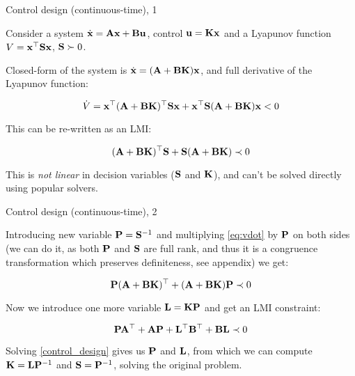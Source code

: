 \documentclass{beamer}
\begin{document}
\begin{frame}{Control design (continuous-time), 1}
	\begin{flushleft}
		
		Consider a system $\dot{\mathbf{x}} = \mathbf{A}\mathbf{x} + \mathbf{B}\mathbf{u}$, control $\mathbf{u} = \mathbf{K}\mathbf{x}$ and a Lyapunov function $V = \mathbf{x}^\top\mathbf{S}\mathbf{x}$, $\mathbf{S} \succ 0$.
		
		\bigskip
		
		Closed-form of the system is $\dot{\mathbf{x}} = (\mathbf{A} + \mathbf{B}\mathbf{K})\mathbf{x}$, and full derivative of the Lyapunov function:
		
		\begin{equation}
			\dot V = \mathbf{x}^\top (\mathbf{A} + \mathbf{B}\mathbf{K})^\top\mathbf{S}\mathbf{x} + \mathbf{x}^\top\mathbf{S} (\mathbf{A} + \mathbf{B}\mathbf{K}) \mathbf{x} < 0
		\end{equation}
		
		This can be re-written as an LMI:
		
		\begin{equation}
			\label{eq:vdot}
			(\mathbf{A} + \mathbf{B}\mathbf{K})^\top\mathbf{S} + \mathbf{S} (\mathbf{A} + \mathbf{B}\mathbf{K}) \prec 0
		\end{equation}
		
		This is \emph{not linear} in decision variables ($\mathbf{S}$ and $\mathbf{K}$), and can't be solved directly using popular solvers.
		
	\end{flushleft}
\end{frame}




\begin{frame}{Control design (continuous-time), 2}
	\begin{flushleft}
		
		Introducing new variable $\mathbf{P} = \mathbf{S}^{-1}$ and multiplying \eqref{eq:vdot} by $\mathbf{P}$ on both sides (we can do it, as both $\mathbf{P}$ and $\mathbf{S}$ are full rank, and thus it is a congruence transformation which preserves definiteness, see appendix) we get:
		
		\begin{equation}
			\mathbf{P}(\mathbf{A} + \mathbf{B}\mathbf{K})^\top + (\mathbf{A} + \mathbf{B}\mathbf{K})\mathbf{P} \prec 0
		\end{equation}
		
		Now we introduce one more variable $\mathbf{L} = \mathbf{K}\mathbf{P}$ and get an LMI constraint:
		
		\begin{equation}
			\label{control_design}
			\mathbf{P}\mathbf{A}^\top + \mathbf{A}\mathbf{P} + \mathbf{L}^\top\mathbf{B}^\top + \mathbf{B}\mathbf{L} \prec 0
		\end{equation}
		
		Solving \eqref{control_design} gives us $\mathbf{P}$ and $\mathbf{L}$, from which we can compute $\mathbf{K} = \mathbf{L}\mathbf{P}^{-1}$ and $\mathbf{S} = \mathbf{P}^{-1}$, solving the original problem.
		
	\end{flushleft}
\end{frame}
\end{document}

